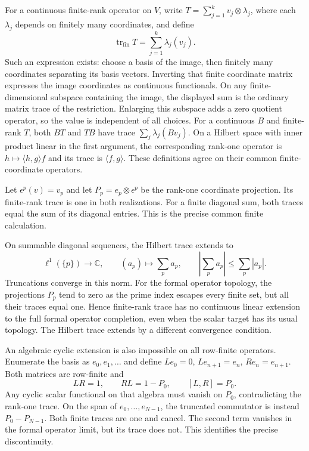 For a continuous finite-rank operator on $\widehat V$, write
$T=\sum_{j=1}^k v_j\otimes\lambda_j$, where each $\lambda_j$ depends
on finitely many coordinates, and define
\[
 \operatorname{tr}_{\mathrm{fin}}T=\sum_{j=1}^k\lambda_j(v_j).
\]
Such an expression exists: choose a basis of the image, then finitely
many coordinates separating its basis vectors. Inverting that finite
coordinate matrix expresses the image coordinates as continuous
functionals. On any finite-dimensional subspace containing the image,
the displayed sum is the ordinary matrix trace of the restriction.
Enlarging this subspace adds a zero quotient operator, so the value is
independent of all choices. For a continuous $B$ and finite-rank $T$,
both $BT$ and $TB$ have trace $\sum_j\lambda_j(Bv_j)$.
On a Hilbert space with inner product linear in the first argument,
the corresponding rank-one operator is $h\mapsto\langle h,g\rangle f$
and its trace is $\langle f,g\rangle$. These definitions agree on
their common finite-coordinate operators.

Let $\epsilon^p(v)=v_p$ and let $P_p=e_p\otimes\epsilon^p$ be the rank-one coordinate
projection. Its finite-rank trace is one in both realizations.
For a finite diagonal sum, both traces equal the sum of its
diagonal entries. This is the precise common finite calculation.

On summable diagonal sequences, the Hilbert trace extends to
\[
 \ell^1(\{p\})\longrightarrow\mathbb C,
 \qquad (a_p)\longmapsto\sum_p a_p,
 \qquad \left|\sum_p a_p\right|\leq\sum_p|a_p|.
\]
Truncations converge in this norm. For the formal operator topology,
the projections $P_p$ tend to zero as the prime index escapes every
finite set, but all their traces equal one. Hence finite-rank trace
has no continuous linear extension to the full formal operator
completion, even when the scalar target has its usual topology.
The Hilbert trace extends by a different convergence condition.

An algebraic cyclic extension is also impossible on all row-finite
operators. Enumerate the basis as $e_0,e_1,\ldots$ and define
$Le_0=0$, $Le_{n+1}=e_n$, $Re_n=e_{n+1}$.
Both matrices are row-finite and
\[
 LR=1,\qquad RL=1-P_0,\qquad [L,R]=P_0.
\]
Any cyclic scalar functional on that algebra must vanish on $P_0$,
contradicting the rank-one trace. On the span of
$e_0,\ldots,e_{N-1}$, the truncated commutator is instead
$P_0-P_{N-1}$. Both finite traces are one and cancel.
The second term vanishes in the formal operator limit, but its
trace does not. This identifies the precise discontinuity.

